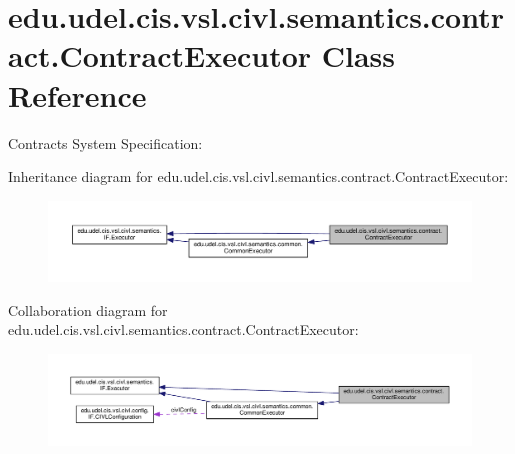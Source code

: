 \hypertarget{classedu_1_1udel_1_1cis_1_1vsl_1_1civl_1_1semantics_1_1contract_1_1ContractExecutor}{}\section{edu.\+udel.\+cis.\+vsl.\+civl.\+semantics.\+contract.\+Contract\+Executor Class Reference}
\label{classedu_1_1udel_1_1cis_1_1vsl_1_1civl_1_1semantics_1_1contract_1_1ContractExecutor}


Contracts System Specification\+:~\newline
  




Inheritance diagram for edu.\+udel.\+cis.\+vsl.\+civl.\+semantics.\+contract.\+Contract\+Executor\+:
\nopagebreak
\begin{figure}[H]
\begin{center}
\leavevmode
\includegraphics[width=350pt]{classedu_1_1udel_1_1cis_1_1vsl_1_1civl_1_1semantics_1_1contract_1_1ContractExecutor__inherit__graph}
\end{center}
\end{figure}


Collaboration diagram for edu.\+udel.\+cis.\+vsl.\+civl.\+semantics.\+contract.\+Contract\+Executor\+:
\nopagebreak
\begin{figure}[H]
\begin{center}
\leavevmode
\includegraphics[width=350pt]{classedu_1_1udel_1_1cis_1_1vsl_1_1civl_1_1semantics_1_1contract_1_1ContractExecutor__coll__graph}
\end{center}
\end{figure}
